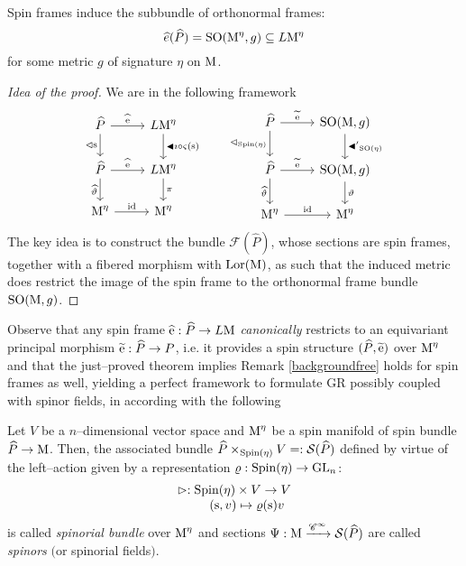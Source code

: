 \begin{teo}
Spin frames induce the subbundle of orthonormal frames:
    $$\widehat{e}(\widehat{P})=\text{\normalfont SO}(\text{\normalfont M}^\eta,g)\subseteq L\text{\normalfont M}^\eta$$
    for some metric $g$ of signature $\eta$ on $\text{\normalfont M}$.
\end{teo}
\begin{proof}[Idea of the proof]
We are in the following framework
     \[\begin{tikzcd}
\widehat{P}\arrow{r}{\widehat{\e}} \arrow[swap]{d}{\vartriangleleft\s} & L\M^\eta \arrow{d}{\blacktriangleleft\imath\circ\varsigma(\s)} \\
\widehat{P}\arrow{r}{\widehat{\e}}\arrow[swap]{d}{\widehat{\vartheta}} & L\M^\eta\arrow{d}{\pi} \\
\M^\eta\arrow{r}{\id} & \M^\eta
\end{tikzcd}\qquad\begin{tikzcd}
\widehat{P}\arrow{r}{\widetilde{\e}} \arrow[swap]{d}{\vartriangleleft_{\Spin(\eta)}} & \SO(\M,g) \arrow{d}{{\blacktriangleleft'}_{\SO(\eta)}} \\
\widehat{P}\arrow{r}{\widetilde{\e}}\arrow[swap]{d}{\widehat{\vartheta}} & \SO(\M,g)\arrow{d}{\vartheta} \\
\M^\eta\arrow{r}{\id} & \M^\eta
\end{tikzcd}
\]  
The key idea is to construct the bundle $\mathcal{F}(\widehat{P})$, whose sections are spin frames, together with a fibered morphism with $\text{\normalfont Lor}(\text{\normalfont M})$, as such that the induced metric does restrict the image of the spin frame to the orthonormal frame bundle $\text{\normalfont SO}(\text{\normalfont M},g)$.

\end{proof}

Observe that any spin frame $\widehat{\text{\normalfont e}}:\widehat{P}\to L\text{\normalfont M}$ \emph{canonically} restricts to an equivariant principal morphism $\widetilde{\text{\normalfont e}}:\widehat{P}\to P$, i.e. it provides a spin structure $(\widehat{P},\widetilde{\text{\normalfont e}})$ over $\text{\normalfont M}^\eta$ %
and that the just--proved theorem implies Remark \ref{backgroundfree} holds for spin frames as well, yielding a perfect framework to formulate GR possibly coupled with spinor fields, in according with the following

\begin{defi}
    Let $V$ be a $n$--dimensional vector space and $\text{\normalfont M}^\eta$ be a spin manifold of spin bundle $\widehat{P}\to\text{\normalfont M}$. Then, the associated bundle $\widehat{P}\times_{\text{\normalfont Spin}(\eta)}V=:\mathcal{S}(\widehat{P})$ defined by virtue of the left--action given by a representation $\varrho:\text{\normalfont Spin}(\eta)\to\text{\normalfont GL}_n$:
    $$\begin{matrix}
    \vartriangleright:\text{\normalfont Spin}(\eta)\times V\to V\\
    \qquad (\text{\normalfont s},v)\mapsto\varrho(\text{\normalfont s})v
    \end{matrix}$$
    is called \emph{spinorial bundle} over $\text{\normalfont M}^\eta$ and sections $\Psi:\text{\normalfont M}\xrightarrow{\mathscr{C}^\infty}\mathcal{S}(\widehat{P})$ are called \emph{spinors} $($or spinorial fields$)$.
\end{defi}

